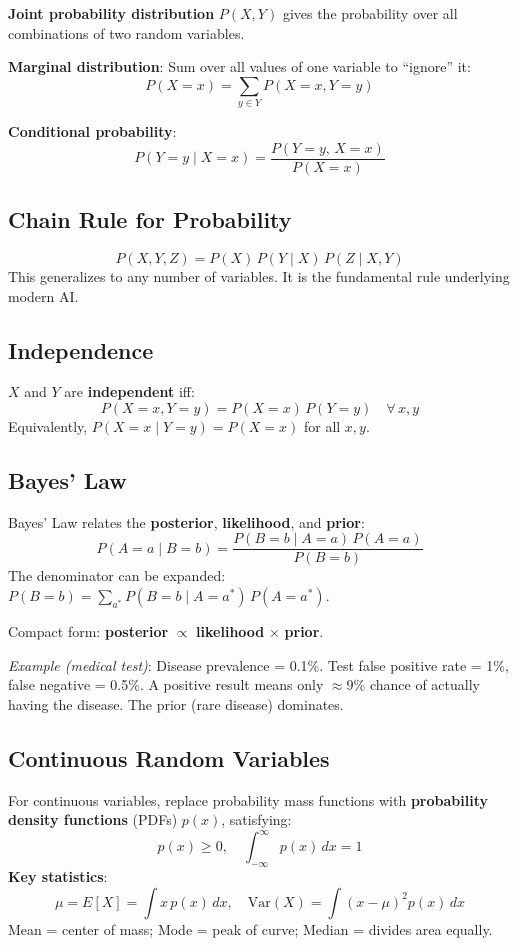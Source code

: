 \documentclass[11pt]{article}
\begin{document}
\textbf{Joint probability distribution} $P(X, Y)$ gives the probability over all combinations of two random variables.

\textbf{Marginal distribution}: Sum over all values of one variable to ``ignore'' it:
\[
  P(X = x) = \sum_{y \in Y} P(X = x, Y = y)
\]

\textbf{Conditional probability}:
\[
  P(Y = y \mid X = x) = \frac{P(Y = y,\, X = x)}{P(X = x)}
\]

\subsection{Chain Rule for Probability}
\[
  P(X, Y, Z) = P(X)\,P(Y \mid X)\,P(Z \mid X, Y)
\]
This generalizes to any number of variables. It is the fundamental rule underlying modern AI.

\subsection{Independence}
$X$ and $Y$ are \textbf{independent} iff:
\[
  P(X=x, Y=y) = P(X=x)\,P(Y=y) \quad \forall\, x, y
\]
Equivalently, $P(X=x \mid Y=y) = P(X=x)$ for all $x, y$.

\subsection{Bayes' Law}
Bayes' Law relates the \textbf{posterior}, \textbf{likelihood}, and \textbf{prior}:
\[
  P(A=a \mid B=b) = \frac{P(B=b \mid A=a)\,P(A=a)}{P(B=b)}
\]
The denominator can be expanded: $P(B=b) = \sum_{a^*} P(B=b \mid A=a^*)\,P(A=a^*)$.

Compact form: \textbf{posterior} $\propto$ \textbf{likelihood} $\times$ \textbf{prior}.

\textit{Example (medical test)}: Disease prevalence = 0.1\%. Test false positive rate = 1\%, false negative = 0.5\%. A positive result means only $\approx 9\%$ chance of actually having the disease. The prior (rare disease) dominates.

\subsection{Continuous Random Variables}

For continuous variables, replace probability mass functions with \textbf{probability density functions} (PDFs) $p(x)$, satisfying:
\[
  p(x) \geq 0, \quad \int_{-\infty}^{\infty} p(x)\,dx = 1
\]
\textbf{Key statistics}:
\[
  \mu = E[X] = \int x\,p(x)\,dx, \quad
  \text{Var}(X) = \int (x-\mu)^2 p(x)\,dx
\]
Mean = center of mass; Mode = peak of curve; Median = divides area equally.
\end{document}
